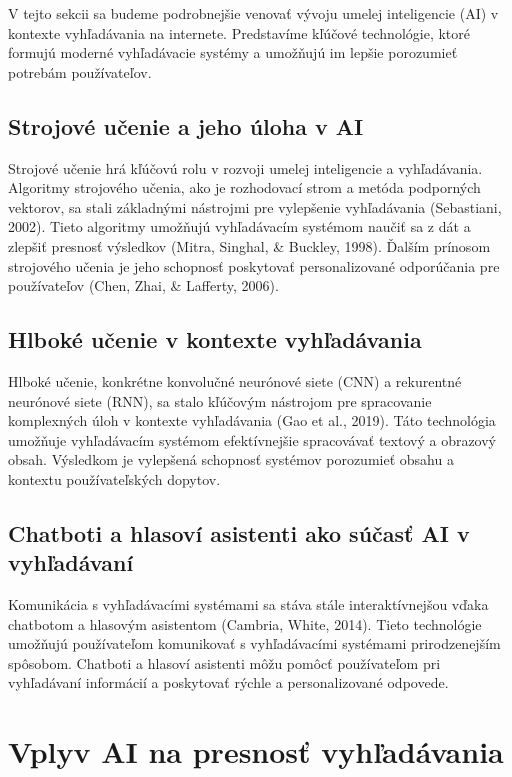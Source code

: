 \documentclass[10pt,twoside,slovak,a4paper]{article}
\begin{document}
V tejto sekcii sa budeme podrobnejšie venovať vývoju umelej inteligencie (AI) v kontexte vyhľadávania na internete. Predstavíme kľúčové technológie, ktoré formujú moderné vyhľadávacie systémy a umožňujú im lepšie porozumieť potrebám používateľov.

\subsection{Strojové učenie a jeho úloha v AI}
\label{subsec:strojové-učenie}

Strojové učenie hrá kľúčovú rolu v rozvoji umelej inteligencie a vyhľadávania. Algoritmy strojového učenia, ako je rozhodovací strom a metóda podporných vektorov, sa stali základnými nástrojmi pre vylepšenie vyhľadávania (Sebastiani, 2002). Tieto algoritmy umožňujú vyhľadávacím systémom naučiť sa z dát a zlepšiť presnosť výsledkov (Mitra, Singhal, & Buckley, 1998). Ďalším prínosom strojového učenia je jeho schopnosť poskytovať personalizované odporúčania pre používateľov (Chen, Zhai, & Lafferty, 2006).

\subsection{Hlboké učenie v kontexte vyhľadávania}
\label{subsec:hlboké-učenie}

Hlboké učenie, konkrétne konvolučné neurónové siete (CNN) a rekurentné neurónové siete (RNN), sa stalo kľúčovým nástrojom pre spracovanie komplexných úloh v kontexte vyhľadávania (Gao et al., 2019). Táto technológia umožňuje vyhľadávacím systémom efektívnejšie spracovávať textový a obrazový obsah. Výsledkom je vylepšená schopnosť systémov porozumieť obsahu a kontextu používateľských dopytov.

\subsection{Chatboti a hlasoví asistenti ako súčasť AI v vyhľadávaní}
\label{subsec:chatboti-hlasoví-asistenti}

Komunikácia s vyhľadávacími systémami sa stáva stále interaktívnejšou vďaka chatbotom a hlasovým asistentom (Cambria, White, 2014). Tieto technológie umožňujú používateľom komunikovať s vyhľadávacími systémami prirodzenejším spôsobom. Chatboti a hlasoví asistenti môžu pomôcť používateľom pri vyhľadávaní informácií a poskytovať rýchle a personalizované odpovede.

\section{Vplyv AI na presnosť vyhľadávania}
\label{sec:vplyv-ai-presnost}
\end{document}
